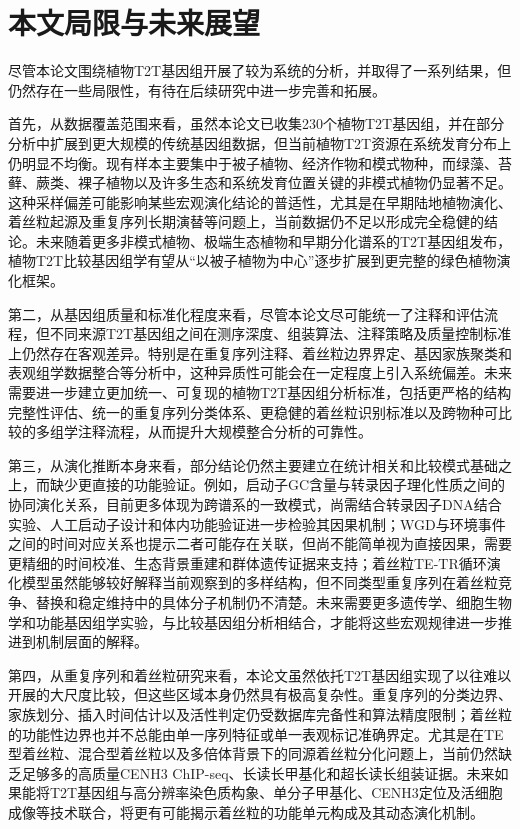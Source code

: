 \section{本文局限与未来展望}

尽管本论文围绕植物T2T基因组开展了较为系统的分析，并取得了一系列结果，但仍然存在一些局限性，有待在后续研究中进一步完善和拓展。

首先，从数据覆盖范围来看，虽然本论文已收集230个植物T2T基因组，并在部分分析中扩展到更大规模的传统基因组数据，但当前植物T2T资源在系统发育分布上仍明显不均衡。现有样本主要集中于被子植物、经济作物和模式物种，而绿藻、苔藓、蕨类、裸子植物以及许多生态和系统发育位置关键的非模式植物仍显著不足。这种采样偏差可能影响某些宏观演化结论的普适性，尤其是在早期陆地植物演化、着丝粒起源及重复序列长期演替等问题上，当前数据仍不足以形成完全稳健的结论。未来随着更多非模式植物、极端生态植物和早期分化谱系的T2T基因组发布，植物T2T比较基因组学有望从“以被子植物为中心”逐步扩展到更完整的绿色植物演化框架。

第二，从基因组质量和标准化程度来看，尽管本论文尽可能统一了注释和评估流程，但不同来源T2T基因组之间在测序深度、组装算法、注释策略及质量控制标准上仍然存在客观差异。特别是在重复序列注释、着丝粒边界界定、基因家族聚类和表观组学数据整合等分析中，这种异质性可能会在一定程度上引入系统偏差。未来需要进一步建立更加统一、可复现的植物T2T基因组分析标准，包括更严格的结构完整性评估、统一的重复序列分类体系、更稳健的着丝粒识别标准以及跨物种可比较的多组学注释流程，从而提升大规模整合分析的可靠性。

第三，从演化推断本身来看，部分结论仍然主要建立在统计相关和比较模式基础之上，而缺少更直接的功能验证。例如，启动子GC含量与转录因子理化性质之间的协同演化关系，目前更多体现为跨谱系的一致模式，尚需结合转录因子DNA结合实验、人工启动子设计和体内功能验证进一步检验其因果机制；WGD与环境事件之间的时间对应关系也提示二者可能存在关联，但尚不能简单视为直接因果，需要更精细的时间校准、生态背景重建和群体遗传证据来支持；着丝粒TE-TR循环演化模型虽然能够较好解释当前观察到的多样结构，但不同类型重复序列在着丝粒竞争、替换和稳定维持中的具体分子机制仍不清楚。未来需要更多遗传学、细胞生物学和功能基因组学实验，与比较基因组分析相结合，才能将这些宏观规律进一步推进到机制层面的解释。

第四，从重复序列和着丝粒研究来看，本论文虽然依托T2T基因组实现了以往难以开展的大尺度比较，但这些区域本身仍然具有极高复杂性。重复序列的分类边界、家族划分、插入时间估计以及活性判定仍受数据库完备性和算法精度限制；着丝粒的功能性边界也并不总能由单一序列特征或单一表观标记准确界定。尤其是在TE型着丝粒、混合型着丝粒以及多倍体背景下的同源着丝粒分化问题上，当前仍然缺乏足够多的高质量CENH3 ChIP-seq、长读长甲基化和超长读长组装证据。未来如果能将T2T基因组与高分辨率染色质构象、单分子甲基化、CENH3定位及活细胞成像等技术联合，将更有可能揭示着丝粒的功能单元构成及其动态演化机制。

